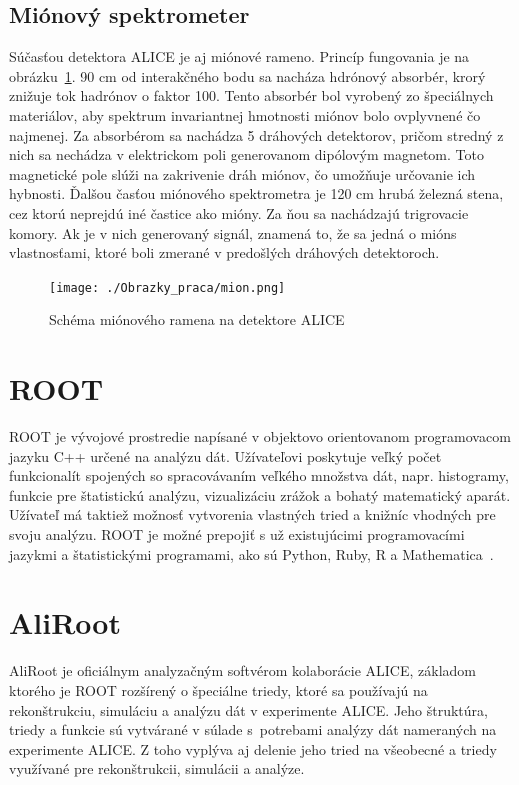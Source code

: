 \documentclass[thesismargins, thesislinespacing]{rnthesis}
\begin{document}
\subsection{Miónový spektrometer}
Súčasťou detektora ALICE je aj miónové rameno. Princíp fungovania je na obrázku~\ref{mion}. 90 cm od interakčného bodu sa nacháza hdrónový absorbér, krorý znižuje tok hadrónov o faktor 100. Tento absorbér bol vyrobený zo špeciálnych materiálov, aby spektrum invariantnej hmotnosti miónov bolo ovplyvnené čo najmenej. Za absorbérom sa nachádza 5 dráhových detektorov, pričom stredný z nich sa nechádza v elektrickom poli generovanom dipólovým magnetom. Toto magnetické pole slúži na zakrivenie dráh miónov, čo umožňuje určovanie ich hybnosti. Ďalšou časťou miónového spektrometra je 120 cm hrubá železná stena, cez ktorú neprejdú iné častice ako mióny. Za ňou sa nachádzajú trigrovacie komory. Ak je v nich generovaný signál, znamená to, že sa jedná o mións vlastnosťami, ktoré boli zmerané v predošlých dráhových detektoroch.

\begin{figure}[hbtp!]
	\begin{center}
		\texttt{[image: ./Obrazky\_praca/mion.png]}
		\caption{Schéma miónového ramena na detektore ALICE}
		\label{mion}
	\end{center}
\end{figure}

\section{ROOT}
ROOT je vývojové prostredie napísané v objektovo orientovanom programovacom jazyku C++ určené na analýzu dát. Užívateľovi poskytuje veľký počet funkcionalít spojených so spracovávaním veľkého množstva dát, napr. histogramy, funkcie pre štatistickú analýzu, vizualizáciu zrážok a bohatý matematický aparát. Užívateľ má taktiež možnosť vytvorenia vlastných tried a knižníc vhodných pre svoju analýzu. ROOT je možné prepojiť s už existujúcimi programovacími jazykmi a štatistickými programami, ako sú Python, Ruby, R a Mathematica~\cite{root}.

\section{AliRoot}
AliRoot je oficiálnym analyzačným softvérom kolaborácie ALICE, základom ktorého je ROOT rozšírený o špeciálne triedy, ktoré sa používajú na rekonštrukciu, simuláciu a analýzu dát v experimente ALICE. Jeho štruktúra, triedy a funkcie sú vytvárané v súlade s~potrebami analýzy dát nameraných na experimente ALICE. Z toho vyplýva aj delenie jeho tried na všeobecné a triedy využívané pre rekonštrukcii, simulácii a analýze. 
\end{document}
